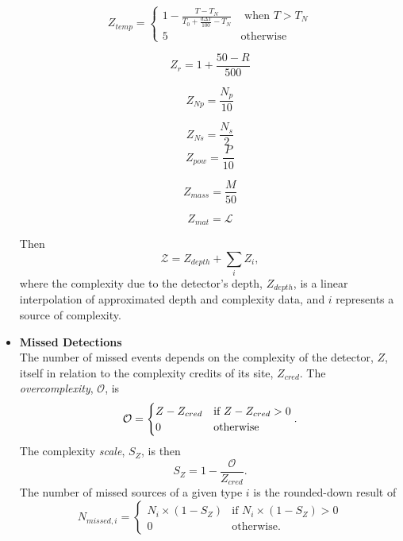 \documentclass{article}
\begin{document}
\begin{itemize}
        \[Z_{temp} = \begin{cases}
                     1 - \frac{T - T_N}{T_0 + \frac{d\Delta T}{100} - T_N} & \text{ when $T > T_N$} \\
                      5 & \text{otherwise}
                     \end{cases}
        \]
\begin{multicols}{2}   
        \[Z_{r} = 1 + \frac{50 - R}{500}
        \]
        
        \[Z_{Np} = \frac{N_p}{10}
        \]

        \[Z_{Ns} = \frac{N_s}{2}
        \]
        \break
        \[Z_{pow} = \frac{P}{10}
        \]

        \[Z_{mass} = \frac{M}{50}
        \]
        
        \[Z_{mat} = \mathcal{L}
        \]
\end{multicols}  
Then
\[
\mathcal{Z} = Z_{depth} + \sum_{i} Z_i,
\]
where the complexity due to the detector's depth, $Z_{depth}$, is a linear interpolation of approximated depth and complexity data, and $i$ represents a source of complexity.
\item\textbf{Missed Detections}\\
    The number of missed events depends on the complexity of the detector, $Z$, itself in relation to the complexity credits of its site, $Z_{cred}$. The \textit{overcomplexity}, $\mathcal{O}$, is
    \[
    \mathcal{O} = \begin{cases}
                  Z - Z_{cred} & \text{if $ Z - Z_{cred} > 0$} \\
                  0 & \text{otherwise}
                  \end{cases}.
    \]
    The complexity \textit{scale}, $S_{Z}$, is then
    \[
    S_{Z} = 1 - \frac{\mathcal{O}}{Z_{cred}}.
    \]
    The number of missed sources of a given type $i$ is the rounded-down result of
    \[
    N_{missed, i} = \begin{cases}
                    N_i \times (1 - S_Z) & \text{if $N_i \times (1 - S_Z) > 0$} \\
                    0 & \text{otherwise}.
                    \end{cases}
    \]
\end{itemize}
\end{document}
